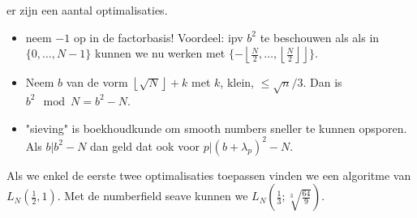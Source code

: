 er zijn een aantal optimalisaties.
\begin{itemize}
	\item neem $-1$ op in de factorbasis! Voordeel: ipv $b^2$ te beschouwen als als in $\{0, \ldots, N-1\} $ kunnen we nu werken met $\{-\left\lfloor \frac{N}{2}, \ldots, \left\lfloor \frac{N}{2} \right\rfloor \right\rfloor\} $.
	\item Neem $b$ van de vorm $\left\lfloor \sqrt{N}  \right\rfloor + k$ met $k$, klein, $\le \sqrt{n} / 3$. Dan is $b^2 \mod N = b^2 - N$.  
	\item "sieving" is boekhoudkunde om smooth numbers sneller te kunnen opsporen. 
		Als $b | b^2 - N$ dan geld dat ook voor $p|(b + \lambda_p)^2 - N$. 

\end{itemize}
Als we enkel de eerste twee optimalisaties toepassen vinden we een algoritme van $L_N\left(\frac{1}{2}, 1\right)$. Met de numberfield seave kunnen we $L_N\left(\frac{1}{3}; \sqrt[3]{\frac{64}{9}}\right) $.

